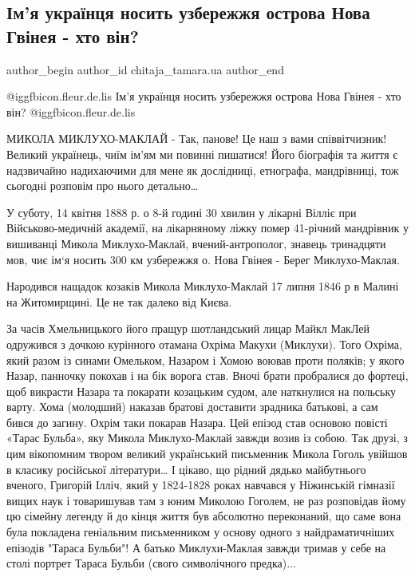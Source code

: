  
 
 
 
 
 
\subsection{Ім'я українця носить узбережжя острова Нова Гвінея - хто він?}
\label{sec:10_11_2022.fb.chitaja_tamara.ua.1.mykluho_maklaj}
 
\ifcmt
 author_begin
   author_id chitaja_tamara.ua
 author_end
\fi

@igg{fbicon.fleur.de.lis} Ім'я українця носить узбережжя острова Нова Гвінея - хто він? @igg{fbicon.fleur.de.lis}

МИКОЛА МИКЛУХО-МАКЛАЙ - Так, панове! Це наш з вами співвітчизник! Великий
українець, чиїм ім'ям ми повинні пишатися! Його біографія та життя є
надзвичайно надихаючими для мене як дослідниці, етнографа, мандрівниці, тож
сьогодні розповім про нього детально…

У суботу, 14 квітня 1888 р. о 8-й годині 30 хвилин у лікарні Вілліє при
Військово-медичній академії, на лікарняному ліжку помер 41-річний мандрівник у
вишиванці Микола Миклухо-Маклай, вчений-антрополог, знавець тринадцяти мов, чиє
ім`я носить 300 км узбережжя о. Нова Гвінея - Берег Миклухо-Маклая.

Народився нащадок козаків Микола Миклухо-Маклай 17 липня 1846 р в Малині на
Житомирщині. Це не так далеко від Києва. 

За часів Хмельницького його пращур шотландський лицар Майкл МакЛей одружився з
дочкою курінного отамана Охріма Макухи (Миклухи). Того Охріма, який разом із
синами Омельком, Назаром і Хомою воював проти поляків; у якого Назар, панночку
покохав і на бік ворога став. Вночі брати пробралися до фортеці, щоб викрасти
Назара та покарати козацьким судом, але наткнулися на польську варту. Хома
(молодший) наказав братові доставити зрадника батькові, а сам бився до загину.
Охрім таки покарав Назара. Цей епізод став основою повісті «Тарас Бульба», яку
Микола Миклухо-Маклай завжди возив із собою. Так друзі, з цим вікопомним твором
великий український письменник Микола Гоголь увійшов в класику російської
літератури… І цікаво, що рідний дядько майбутнього вченого, Григорій Ілліч,
який у 1824-1828 роках навчався у Ніжинській гімназії вищих наук і товаришував
там з юним Миколою Гоголем, не раз розповідав йому цю сімейну легенду й до
кінця життя був абсолютно переконаний, що саме вона була покладена геніальним
письменником у основу одного з найдраматичніших епізодів "Тараса Бульби"! А
батько Миклухи-Маклая завжди тримав у себе на столі портрет Тараса Бульби
(свого символічного предка)...

